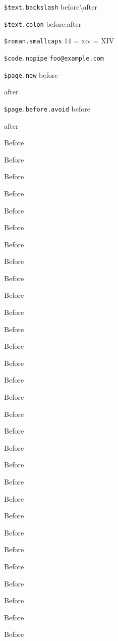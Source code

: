 \documentclass[demo]{pyscribe}
\begin{document}
\par\medskip
\texttt{\$text.backslash} before\textbackslash{}after
\par\medskip
\texttt{\$text.colon} before\string:after
\par\medskip
\texttt{\$roman.smallcaps} 14 = \textsc{xiv} = XIV
\par\medskip
\texttt{\$code.nopipe} \verb|foo@example.com|

\par\medskip
\texttt{\$page.new} before \par \clearpage \par after
\par\medskip
\texttt{\$page.before.avoid} before \par \nopagebreak[4] \par after
\par Before \par Before \par Before \par Before \par Before \par Before \par Before \par Before \par Before \par Before \par Before \par Before \par Before \par Before \par Before \par Before \par Before \par Before \par Before \par Before \par Before \par Before \par Before \par Before \par Before \par Before \par Before \par Before \par Before \par Before \par
\par\medskip
\end{document}
